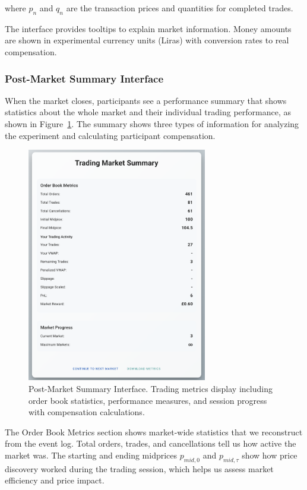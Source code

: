 where $p_n$ and $q_n$ are the transaction prices and quantities for completed trades.

The interface provides tooltips to explain market information. Money amounts are shown in experimental currency units (Liras) with conversion rates to real compensation.

\subsubsection{Post-Market Summary Interface}

When the market closes, participants see a performance summary that shows statistics about the whole market and their individual trading performance, as shown in Figure~\ref{fig:summary}. The summary shows three types of information for analyzing the experiment and calculating participant compensation.

\begin{figure}[!htbp]
\centering
\includegraphics[width=0.7\textwidth]{figs/summary-page.png}
\caption{Post-Market Summary Interface. Trading metrics display including order book statistics, performance measures, and session progress with compensation calculations.}
\label{fig:summary}
\end{figure}

The Order Book Metrics section shows market-wide statistics that we reconstruct from the event log. Total orders, trades, and cancellations tell us how active the market was. The starting and ending midprices $p_{mid,0}$ and $p_{mid,\tau}$ show how price discovery worked during the trading session, which helps us assess market efficiency and price impact.


